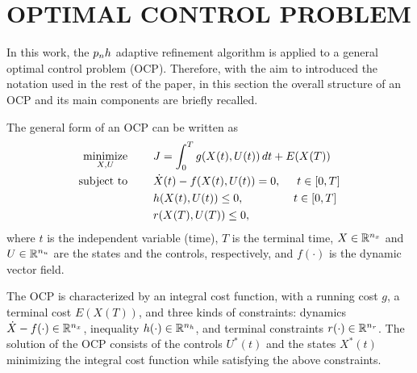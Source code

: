 \section*{OPTIMAL CONTROL PROBLEM}

In this work, the $p_{n}h$ adaptive refinement algorithm is applied to a general optimal control problem (OCP). Therefore, with the aim to introduced the notation used in the rest of the paper, in this section the overall structure of an OCP and its main components are briefly recalled.


The general form of an OCP can be written as
\begin{subequations}\label{OCP}
	\begin{align}
	\underset{X,U}{\text{minimize}}\hspace{8mm} &J = \int_{0}^{T}g(X(t),U(t))\,dt + E(X(T)) \label{eq:cost}\\
	\text{subject to} \hspace{8mm} &\dot{X}(t) -  f(X(t),U(t)) = 0, \hspace{5mm} t \in[0,T] \label{eq:dyn}\\
	& h(X(t),U(t)) \leq 0,  \hspace{15.5mm} t \in[0,T] \label{eq:path}\\
	& r(X(T),U(T)) \leq 0, \label{eq:terminal}		
	\end{align}
\end{subequations}
where $t$ is the independent variable (time), $T$ is the terminal time, $X \in \mathbb{R}^{n_{x}}$ and $U \in \mathbb{R}^{n_{u}}$ are the states and the controls, respectively, and $f (\cdot)$ is the dynamic vector field.

The OCP is characterized by an integral cost function, with a running cost $g$, a terminal cost $E(X(T))$, and three kinds of constraints: dynamics $\dot{X}-f(\cdot) \in \mathbb{R}^{n_{x}}$, inequality $h(\cdot) \in \mathbb{R}^{n_{h}}$, and terminal constraints $r(\cdot) \in \mathbb{R}^{n_{r}}$.
The solution of the OCP  consists of the controls $U^{*}(t)$ and the states $X^*(t)$  minimizing the integral cost function while satisfying the above constraints.


